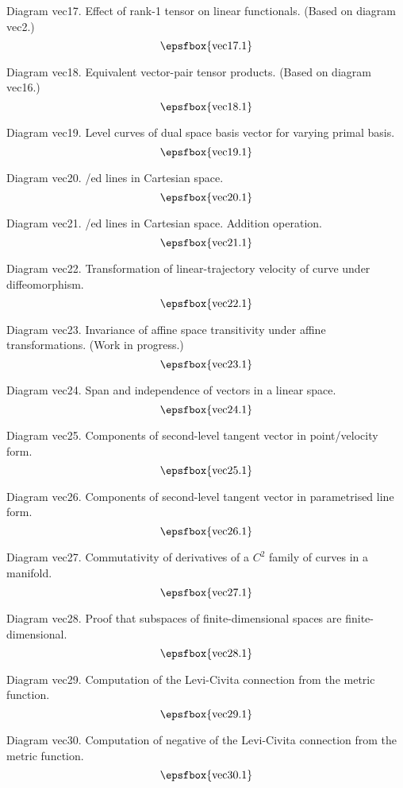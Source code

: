 Diagram vec17. Effect of rank-1 tensor on linear functionals. (Based on diagram
vec2.)
$$
\centerline{\epsfbox{vec17.1}}
$$

Diagram vec18. Equivalent vector-pair tensor products. (Based on diagram
vec16.)
$$
\centerline{\epsfbox{vec18.1}}
$$

\filleject

Diagram vec19. Level curves of dual space basis vector for varying primal basis.
$$
\centerline{\epsfbox{vec19.1}}
$$

Diagram vec20. \Parametris/ed lines in Cartesian space.
$$
\centerline{\epsfbox{vec20.1}}
$$

Diagram vec21. \Parametris/ed lines in Cartesian space. Addition operation.
$$
\centerline{\epsfbox{vec21.1}}
$$

Diagram vec22. Transformation of linear-trajectory velocity of curve under
diffeomorphism.
$$
\centerline{\epsfbox{vec22.1}}
$$

\filleject

Diagram vec23. Invariance of affine space transitivity under affine
transformations. (Work in progress.)
$$
\centerline{\epsfbox{vec23.1}}
$$

Diagram vec24. Span and independence of vectors in a linear space.
$$
\centerline{\epsfbox{vec24.1}}
$$

Diagram vec25. Components of second-level tangent vector in point/velocity form.
$$
\centerline{\epsfbox{vec25.1}}
$$

Diagram vec26. Components of second-level tangent vector in parametrised line
form.
$$
\centerline{\epsfbox{vec26.1}}
$$

\filleject

Diagram vec27. Commutativity of derivatives of a $C^2$ family of curves in a
manifold.
$$
\centerline{\epsfbox{vec27.1}}
$$

Diagram vec28. Proof that subspaces of finite-dimensional spaces are
finite-dimensional.
$$
\centerline{\epsfbox{vec28.1}}
$$

Diagram vec29. Computation of the Levi-Civita connection from the metric
function.
$$
\centerline{\epsfbox{vec29.1}}
$$

Diagram vec30. Computation of negative of the Levi-Civita connection from the
metric function.
$$
\centerline{\epsfbox{vec30.1}}
$$

